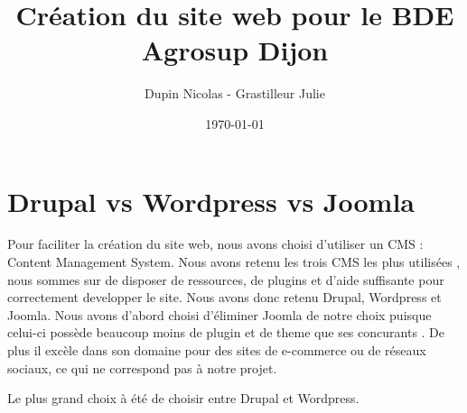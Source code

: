 \documentclass{report}
\title{Création du site web pour le BDE Agrosup Dijon}
\author{Dupin Nicolas - Grastilleur Julie}
\date{\today}
\begin{document}
\section{Drupal vs Wordpress vs Joomla}

Pour faciliter la création du site web, nous avons choisi d'utiliser un CMS : Content Management System. Nous avons retenu les trois CMS les plus utilisées \cite{popularite1}, nous sommes sur de disposer de ressources, de plugins et d'aide suffisante pour correctement developper le site. Nous avons donc retenu Drupal, Wordpress et Joomla. Nous avons d'abord choisi d'éliminer Joomla de notre choix puisque celui-ci possède beaucoup moins de plugin et de theme que ses concurants \cite{comparatif1}. De plus il excèle dans son domaine pour des sites de e-commerce ou de réseaux sociaux, ce qui ne correspond pas à notre projet.


Le plus grand choix à été de choisir entre Drupal et Wordpress. 



\end{document}

